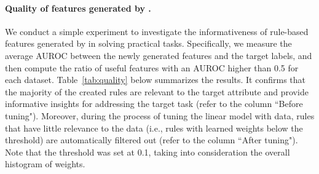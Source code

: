 \documentclass{article}
\theoremstyle{plain}
\theoremstyle{definition}
\theoremstyle{remark}
\begin{document}
\paragraph{Quality of features generated by \model{}.}
We conduct a simple experiment to investigate the informativeness of rule-based features generated by \model{} in solving practical tasks. 
Specifically, we measure the average AUROC between the newly generated features and the target labels, and then compute the ratio of useful features with an AUROC higher than 0.5 for each dataset. 
Table~\ref{tab:quality} below summarizes the results.
It confirms that the majority of the created rules are relevant to the target attribute and provide informative insights for addressing the target task (refer to the column ``Before tuning"). 
Moreover, during the process of tuning the linear model with data, rules that have little relevance to the data (i.e., rules with learned weights below the threshold) are automatically filtered out (refer to the column ``After tuning").
Note that the threshold was set at 0.1, taking into consideration the overall histogram of weights. 

\begin{table}[h!]
\centering
\caption{Evaluation of feature quality before and after linear model tuning. Ratio of newly-generated features with an AUROC higher than 0.5 is reported across datasets.}
\label{tab:quality}
\end{table}
\end{document}
